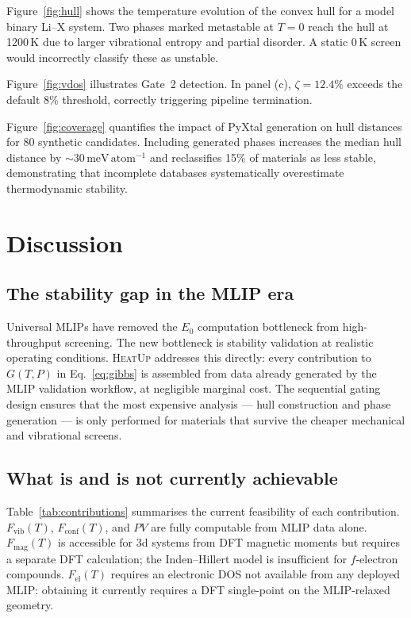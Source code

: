 \documentclass[twocolumn,10pt]{article}
\newcommand{\Fvib}{F_{\mathrm{vib}}}
\newcommand{\Fel}{F_{\mathrm{el}}}
\newcommand{\Fmag}{F_{\mathrm{mag}}}
\newcommand{\Fconf}{F_{\mathrm{conf}}}
\newcommand{\meVat}{\,\mathrm{meV\,atom^{-1}}}
\newcommand{\tp}{\textsc{HeatUp}}
\begin{document}
Figure~\ref{fig:hull} shows the temperature evolution of the convex hull for a
model binary Li--X system.
Two phases marked metastable at $T = 0$ reach the hull at 1200\,K due to larger
vibrational entropy and partial disorder.
A static 0\,K screen would incorrectly classify these as unstable.

Figure~\ref{fig:vdos} illustrates Gate~2 detection.
In panel (c), $\zeta = 12.4\%$ exceeds the default 8\% threshold, correctly
triggering pipeline termination.

Figure~\ref{fig:coverage} quantifies the impact of PyXtal generation on hull
distances for 80 synthetic candidates.
Including generated phases increases the median hull distance by $\sim30\meVat$
and reclassifies 15\% of materials as less stable, demonstrating that incomplete
databases systematically overestimate thermodynamic stability.

\section*{Discussion}

\subsection*{The stability gap in the MLIP era}

Universal MLIPs have removed the $E_0$ computation bottleneck from high-throughput
screening.
The new bottleneck is stability validation at realistic operating conditions.
\tp{} addresses this directly: every contribution to $G(T,P)$ in
Eq.~\eqref{eq:gibbs} is assembled from data already generated by the MLIP
validation workflow, at negligible marginal cost.
The sequential gating design ensures that the most expensive analysis --- hull
construction and phase generation --- is only performed for materials that survive
the cheaper mechanical and vibrational screens.

\subsection*{What is and is not currently achievable}

Table~\ref{tab:contributions} summarises the current feasibility of each
contribution. $\Fvib(T)$, $\Fconf(T)$, and $PV$ are fully computable from MLIP
data alone. $\Fmag(T)$ is accessible for 3d systems from DFT magnetic moments
but requires a separate DFT calculation; the Inden--Hillert model is insufficient
for $f$-electron compounds. $\Fel(T)$ requires an electronic DOS not available
from any deployed MLIP: obtaining it currently requires a DFT single-point
on the MLIP-relaxed geometry.
\end{document}

